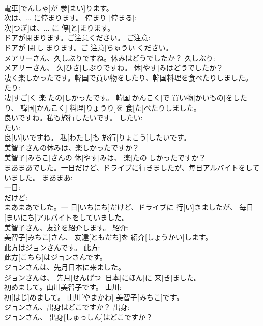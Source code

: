 \documentclass[8pt]{extreport}
\begin{document}
\begin{CJK}{UTF8}{min}
\\	電車[でんしゃ]が 参[まい]ります。		
\\	次は、... に停まります。	停まり [停まる]: 
\\	次[つぎ]は、... に 停[と]まります。		
\\	ドアが閉まります。ご注意ください。	ご注意: 
\\	ドアが 閉[し]まります。ご 注意[ちゅうい]ください。		
\\	メアリーさん、久しぶりですね。休みはどうでしたか？	久しぶり: 
\\	メアリーさん、 久[ひさ]しぶりですね。 休[やす]みはどうでしたか？		
\\	凄く楽しかったです。韓国で買い物をしたり、韓国料理を食べたりしました。	たり: 
\\	凄[すご]く 楽[たの]しかったです。 韓国[かんこく]で 買い物[かいもの]をしたり、 韓国[かんこく] 料理[りょうり]を 食[た]べたりしました。	
\\	良いですね。私も旅行したいです。	したい: 
\\	たい: 
\\	良[い]いですね。 私[わたし]も 旅行[りょこう]したいです。	
\\	美智子さんの休みは、楽しかったですか？	
\\	美智子[みちこ]さんの 休[やす]みは、 楽[たの]しかったですか？	
\\	まあまあでした。一日だけど、ドライブに行きましたが、毎日アルバイトをしていました。	まあまあ: 
\\	一日: 
\\	だけど: 
\\	まあまあでした。一 日[いちにち]だけど、ドライブに 行[い]きましたが、 毎日[まいにち]アルバイトをしていました。	
\\	美智子さん、友達を紹介します。	紹介: 
\\	美智子[みちこ]さん、 友達[ともだち]を 紹介[しょうかい]します。	
\\	此方はジョンさんです。	此方: 
\\	此方[こちら]はジョンさんです。	
\\	ジョンさんは、先月日本に来ました。	
\\	ジョンさんは、 先月[せんげつ] 日本[にほん]に 来[き]ました。	
\\	初めまして。山川美智子です。	山川: 
\\	初[はじ]めまして。 山川[やまかわ] 美智子[みちこ]です。	
\\	ジョンさん、出身はどこですか？	出身: 
\\	ジョンさん、 出身[しゅっしん]はどこですか？	

\end{CJK}
\end{document}

